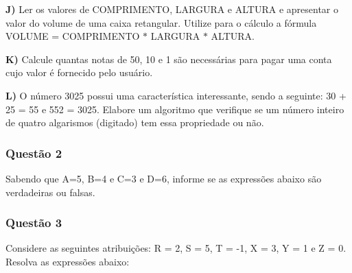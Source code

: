 \begin{DoxyItemize}
\item {\bfseries{J)}} Ler os valores de C\+O\+M\+P\+R\+I\+M\+E\+N\+TO, L\+A\+R\+G\+U\+RA e A\+L\+T\+U\+RA e apresentar o valor do volume de uma caixa retangular. Utilize para o cálculo a fórmula V\+O\+L\+U\+ME = C\+O\+M\+P\+R\+I\+M\+E\+N\+TO $\ast$ L\+A\+R\+G\+U\+RA $\ast$ A\+L\+T\+U\+RA.
\item {\bfseries{K)}} Calcule quantas notas de 50, 10 e 1 são necessárias para pagar uma conta cujo valor é fornecido pelo usuário.
\item {\bfseries{L)}} O número 3025 possui uma característica interessante, sendo a seguinte\+: 30 + 25 = 55 e 552 = 3025. Elabore um algoritmo que verifique se um número inteiro de quatro algarismos (digitado) tem essa propriedade ou não.
\end{DoxyItemize}

\subsubsection*{Questão 2}


\begin{DoxyItemize}
\item Sabendo que {\ttfamily A=5, B=4 e C=3 e D=6}, informe se as expressões abaixo são verdadeiras ou falsas.
\end{DoxyItemize}


\begin{DoxyCode}{0}
\DoxyCodeLine{}
\DoxyCodeLine{}
\DoxyCodeLine{}
\DoxyCodeLine{}
\DoxyCodeLine{}
\DoxyCodeLine{}
\DoxyCodeLine{}
\end{DoxyCode}


\subsubsection*{Questão 3}


\begin{DoxyItemize}
\item Considere as seguintes atribuições\+: {\ttfamily R = 2, S = 5, T = -\/1, X = 3, Y = 1 e Z = 0}. Resolva as expressões abaixo\+:
\end{DoxyItemize}


\begin{DoxyCode}{0}
\DoxyCodeLine{}
\DoxyCodeLine{}
\DoxyCodeLine{}
\end{DoxyCode}


